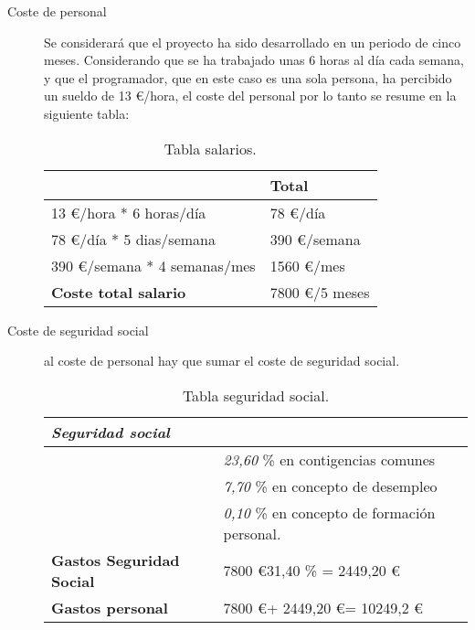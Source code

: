 \begin{description}
	\item[Coste de personal] Se considerará que el proyecto ha sido desarrollado en un periodo de cinco meses.  Considerando que se ha trabajado unas 6 horas al día cada semana, y que el programador, que en este caso es una sola persona, ha percibido un sueldo de 13 \euro /hora, el coste del personal por lo tanto se resume en la siguiente tabla:
	
\begin{table}[htbp]
\begin{center}
\begin{tabular}{|l|l|}
\hline
 & Total \\
\hline \hline
13 \euro /hora * 6 horas/día &   78 \euro /día \\ \hline
78 \euro /día * 5 dias/semana &   390 \euro /semana \\ \hline
390 \euro /semana * 4 semanas/mes &   1560 \euro /mes \\ \hline
\textbf{Coste total salario} &   7800 \euro /5 meses \\ \hline
\end{tabular}
\caption{Tabla salarios.}
\label{tabla:salarios}
\end{center}
\end{table}
	
	\item[Coste de seguridad social] al coste de personal hay que sumar el coste de seguridad social. 
	
	
	\begin{table}[htbp]
\begin{center}
\begin{tabular}{|l|l|}
\hline
 \emph{Seguridad social} &  \\
\hline \hline
 & \emph{23,60} \% en contigencias comunes \\ \hline
&   \emph{7,70} \% en concepto de desempleo \\ \hline
 &   \emph{0,10} \% en concepto de formación personal. \\ \hline
\textbf{Gastos Seguridad Social}  &   7800 \euro  * 31,40 \% =  2449,20 \euro \\ \hline
\textbf{Gastos personal}  &  7800 \euro  + 2449,20 \euro  = 10249,2 \euro  \\ \hline
\end{tabular}
\caption{Tabla seguridad social.}
\label{tabla:ssocial}
\end{center}
\end{table}
	

\end{description}
